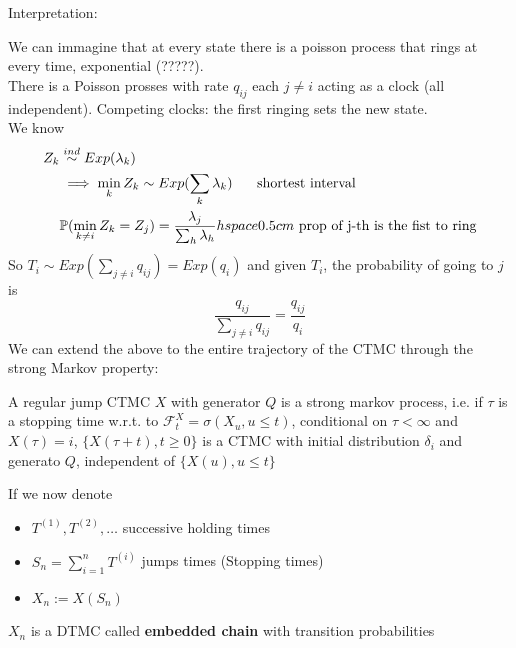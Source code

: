 \documentclass{article}
\begin{document}
Interpretation:
\begin{figure}[H]
	\centering
	
\end{figure}
We can immagine that at every state there is a poisson process that rings at every time, exponential (?????).\\
There is a Poisson prosses with rate $q_{ij}$ each $j \neq i$ acting as a clock (all independent). Competing clocks: the first ringing sets the new state. \\
We know 
\begin{equation*}
	\begin{split}
		Z_k &\stackrel{ind}{\sim} Exp (\lambda_k)\\
		&\implies  \min_k Z_k \sim Exp (\sum_k \lambda_k) \hspace{0.5 cm} \text{ shortest interval}\\
		&\mathbb{P}(\min_{k\neq i} Z_k=Z_j)= \frac{\lambda_j}{\sum_h \lambda_h} hspace{0.5 cm} \text{ prop of j-th is the fist to ring}
	\end{split}
\end{equation*}
So $T_i \sim Exp(\sum_{j\neq i}q_{ij})= Exp(q_i)$ and given $T_i$, the probability of going to $j$ is 
\begin{equation*}
	\frac{q_{ij}}{\sum_{j\neq i}q_{ij}}= \frac{q_{ij}}{q_i}
\end{equation*}
We can extend the above to the entire trajectory of the CTMC through the strong Markov property:
\begin{theorem}
	A regular jump CTMC $X$ with generator $Q$ is a strong markov process, i.e. 
	if $\tau$ is a stopping time w.r.t. to $\mathcal{F}_t ^X= \sigma(X_u, u \leqslant t)$, 
	conditional on $\tau <\infty$ and $X(\tau)=i$, $\{X(\tau+t), t\geqslant 0\}$ is a CTMC with initial distribution $\delta_i$ and generato $Q$, independent of $\{X(u), u\leqslant t\}$
\end{theorem}
If we now denote 
\begin{itemize}
	\item $T^{(1)}, T^{(2)}, \dots$ successive holding times 
	\item  $S_n= \sum_{i=1}^n T^{(i)}$ jumps times (Stopping times)
	\item $X_n:= X(S_n)$
\end{itemize}
\begin{figure}[H]
	\centering
	 
\end{figure}
$X_n$ is  a DTMC called \textbf{embedded chain} with transition probabilities 
\end{document}
